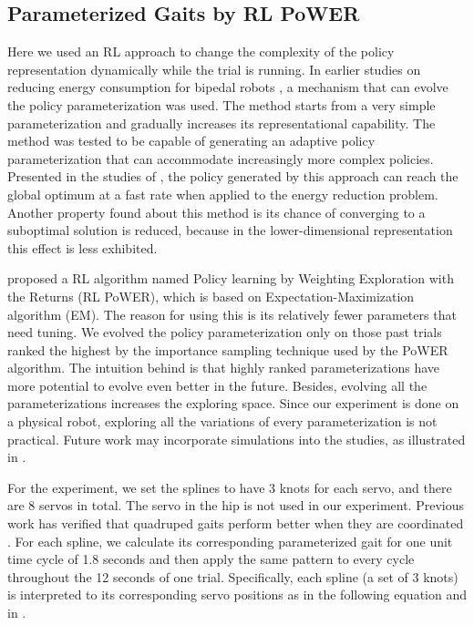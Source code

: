 \subsection{Parameterized Gaits by RL PoWER}

Here we used an RL approach to change the complexity of the policy
representation dynamically while the trial is running. In
earlier studies on reducing energy
consumption for bipedal robots \citep{kormushev2011bipedal-walking-energy}, a mechanism that can
evolve the policy parameterization was used. The method starts from a
very simple parameterization and gradually increases its
representational capability. The method was tested to be capable of generating
an adaptive policy parameterization that can accommodate increasingly
more complex policies. Presented in the studies of \cite{kormushev2011bipedal-walking-energy}, the policy
generated by this approach can reach the global optimum at a fast
rate when applied to the energy reduction problem. Another property found about this method is its chance of converging to a suboptimal solution is reduced, because in the lower-dimensional representation this effect is less exhibited.


\cite{kober2009learning-motor-primitives} proposed a RL algorithm
named Policy learning by Weighting Exploration with the
Returns (RL PoWER), which is based on Expectation-Maximization algorithm
(EM). The reason for using this is its relatively fewer parameters that need tuning. We
evolved the policy parameterization only on those past trials ranked
the highest by the importance sampling technique used by the PoWER
algorithm. The intuition behind is that highly ranked
parameterizations have more potential to evolve even better in the
future. Besides, evolving all the parameterizations increases the exploring space. Since our experiment
is done on a physical robot, exploring all the variations of every
parameterization is not practical. Future work may incorporate simulations into the studies, as illustrated in \cite{bongard2006resilient-machines-through}.

For the experiment, we set the splines to have 3 knots for each servo, and there are 8
servos in total. The servo in the hip is not used in
our experiment. Previous work has verified that quadruped gaits
perform better when they are coordinated \citep{clune2009evolving-coordinated-quadruped, clune2011on-the-performance-of-indirect-encoding, valsalam2008modular-neuroevolution-for-multilegged}. For each spline, we calculate its corresponding parameterized gait for one unit time cycle of 1.8 seconds and then apply the same
pattern to every cycle throughout the 12 seconds of one
trial. Specifically, each spline (a set of 3 knots) is interpreted to its corresponding servo positions as in the following equation and in .

